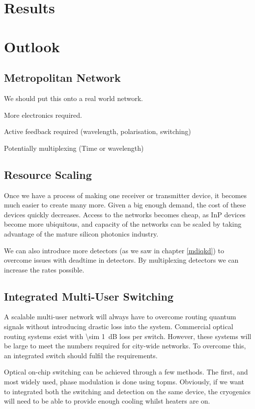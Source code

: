 \section{Results}



\section{Outlook}

\subsection{Metropolitan Network}

We should put this onto a real world network.

More electronics required.

Active feedback required (wavelength, polarisation, switching)

Potentially multiplexing (Time or wavelength)

\subsection{Resource Scaling}

Once we have a process of making one receiver or transmitter device, it becomes much easier to create many more. Given a big enough demand, the cost of these devices quickly decreases. Access to the networks becomes cheap, as \ac{InP} devices become more ubiquitous, and capacity of the networks can be scaled by taking advantage of the mature silicon photonics industry.

We can also introduce more detectors (as we saw in chapter \ref{mdiqkd}) to overcome issues with deadtime in detectors. By multiplexing detectors we can increase the rates possible.

\subsection{Integrated Multi-User Switching}

A scalable multi-user network will always have to overcome routing quantum signals without introducing drastic loss into the system. Commercial optical routing systems exist with \SI{\sim 1}{dB} loss per switch. However, these systems will be large to meet the numbers required for city-wide networks. To overcome this, an integrated switch should fulfil the requirements. 

Optical on-chip switching can be achieved through a few methods. The first, and most widely used, phase modulation is done using \acp{topm}. Obviously, if we want to integrated both the switching and detection on the same device, the cryogenics will need to be able to provide enough cooling whilst heaters are on.

